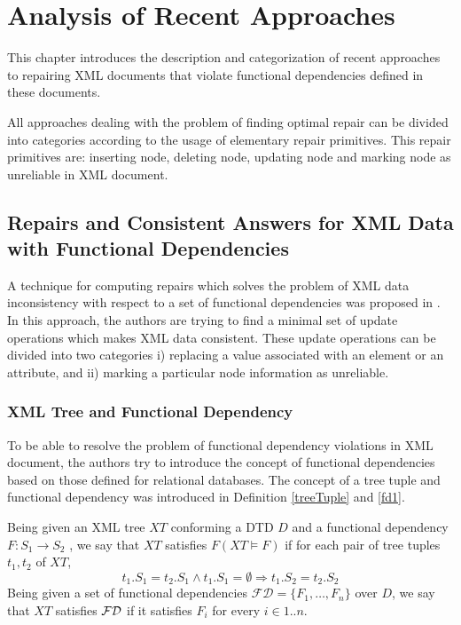 \chapter{Analysis of Recent Approaches}

This chapter introduces the description and categorization of recent approaches to repairing XML documents that violate functional dependencies defined in these documents.

All approaches dealing with the problem of finding optimal repair can be divided into categories according to the usage of elementary repair primitives. This repair primitives are: inserting node, deleting node, updating node and marking node as unreliable in XML document.

\section[Repairs and Consistent Answers for XML Data]{Repairs and Consistent Answers for XML Data with Functional Dependencies}\label{RepConstAnswers}

A technique for computing repairs which solves the problem of XML data inconsistency with respect to a set of functional dependencies was proposed in \cite{RepAndConsistentAnswer}. In this approach, the authors are trying to find a minimal set of update operations which makes XML data consistent. These update operations can be divided into two categories i) replacing a value associated with an element or an attribute, and ii) marking a particular node information as unreliable.

\subsection{XML Tree and Functional Dependency}

To be able to resolve the problem of functional dependency violations in XML document, the authors try to introduce the concept of functional dependencies based on those defined for relational databases. The concept of a tree tuple and functional dependency was introduced in Definition \ref{treeTuple} and \ref{fd1}.

Being given an XML tree $XT$ conforming a DTD $D$ and a functional dependency $F : S_1 \rightarrow S_2$ , we say that $XT$ satisfies $F (XT \models F )$ if for each pair of tree tuples $t_1, t_2$ of $XT$, $$t_1.S_1 = t_2.S_1 \land t_1.S_1 = \emptyset \Rightarrow t_1.S_2 = t_2.S_2$$
Being given a set of functional dependencies $\mathcal{FD} = \{F_1 , \dots, F_n\}$ over $D$, we say that $XT$ satisfies $\cal FD$ if it satisfies $F_i$ for every $i \in 1..n$.

